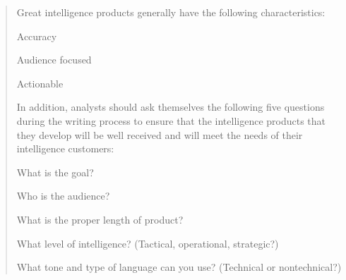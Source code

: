 \documentclass[Screen16to9,17pt]{foils}
\begin{document}
\begin{quote}
Great intelligence products generally have the following characteristics:
\begin{list2}
\item Accuracy
\item Audience focused
\item Actionable
\end{list2}

In addition, analysts should ask themselves the following five questions during the
writing process to ensure that the intelligence products that they develop will be well
received and will meet the needs of their intelligence customers:

\begin{list2}
\item What is the goal?
\item Who is the audience?
\item What is the proper length of product?
\item What level of intelligence? (Tactical, operational, strategic?)
\item What tone and type of language can you use? (Technical or nontechnical?)
\end{list2}
\end{quote}


\end{document}
